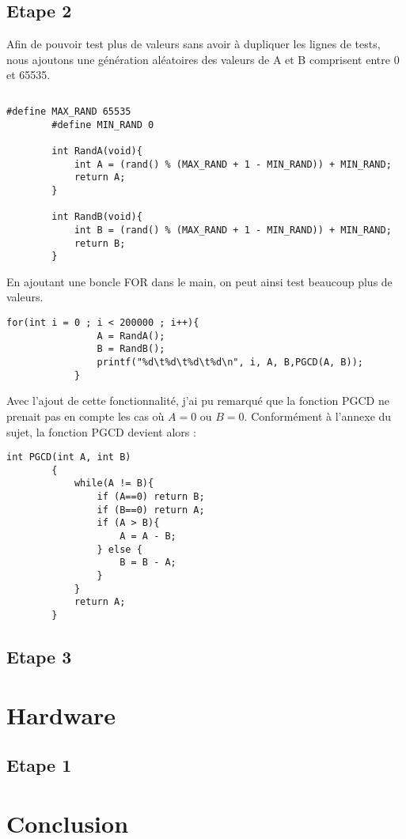 \documentclass[a4paper]{article}
\begin{document}
        
    \subsection{Etape 2}
        Afin de pouvoir test plus de valeurs sans avoir à dupliquer les lignes de tests, nous ajoutons une génération aléatoires des valeurs de A et B comprisent entre 0 et 65535.
        \begin{lstlisting}[style=CStyle]
        \end{lstlisting}
        \begin{lstlisting}[style=CStyle]
        #define MAX_RAND 65535
        #define MIN_RAND 0 
        
        int RandA(void){
        	int A = (rand() % (MAX_RAND + 1 - MIN_RAND)) + MIN_RAND;
            return A;
        }
        
        int RandB(void){
        	int B = (rand() % (MAX_RAND + 1 - MIN_RAND)) + MIN_RAND;
            return B;
        }
        \end{lstlisting}
        En ajoutant une boncle FOR dans le main, on peut ainsi test beaucoup plus de valeurs.
        \begin{lstlisting}[style=CStyle]
        	for(int i = 0 ; i < 200000 ; i++){
        		A = RandA();
        		B = RandB();
        		printf("%d\t%d\t%d\t%d\n", i, A, B,PGCD(A, B));
        	}
        \end{lstlisting}
        
        Avec l'ajout de cette fonctionnalité, j'ai pu remarqué que la fonction PGCD ne prenait pas en compte les cas où $A = 0$ ou $B = 0$.
        Conformément à l'annexe du sujet, la fonction PGCD devient alors :
        \begin{lstlisting}[style=CStyle]
        int PGCD(int A, int B)
        {
        	while(A != B){
        		if (A==0) return B; 
        		if (B==0) return A;
        		if (A > B){
        			A = A - B;
        		} else {
        			B = B - A;
        		}
        	}
        	return A;
        }
        \end{lstlisting}
    
    \subsection{Etape 3}
    
    \subsection{}
    
\section{Hardware}
    \subsection{Etape 1}
    
\section{Conclusion} %


\newpage %

\printbibliography %
\end{document}
